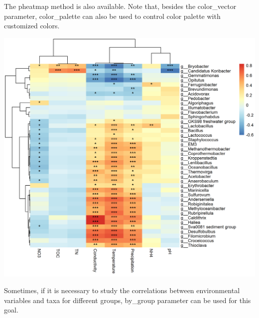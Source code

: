 \documentclass[
]{book}
\newenvironment{Shaded}{\begin{snugshade}}{\end{snugshade}}
\newcommand{\AttributeTok}[1]{\textcolor[rgb]{0.77,0.63,0.00}{#1}}
\newcommand{\CommentTok}[1]{\textcolor[rgb]{0.56,0.35,0.01}{\textit{#1}}}
\newcommand{\ConstantTok}[1]{\textcolor[rgb]{0.00,0.00,0.00}{#1}}
\newcommand{\DecValTok}[1]{\textcolor[rgb]{0.00,0.00,0.81}{#1}}
\newcommand{\FunctionTok}[1]{\textcolor[rgb]{0.00,0.00,0.00}{#1}}
\newcommand{\NormalTok}[1]{#1}
\newcommand{\SpecialCharTok}[1]{\textcolor[rgb]{0.00,0.00,0.00}{#1}}
\newcommand{\StringTok}[1]{\textcolor[rgb]{0.31,0.60,0.02}{#1}}
\begin{document}
The pheatmap method is also available.
Note that, besides the color\_vector parameter,
color\_palette can also be used to control color palette with customized colors.

\begin{Shaded}
\end{Shaded}

\begin{center}\includegraphics[width=700px]{Images/plot_corr_pheatmap} \end{center}

Sometimes, if it is necessary to study the correlations between environmental variables and taxa for different groups,
by\_group parameter can be used for this goal.
\end{document}
